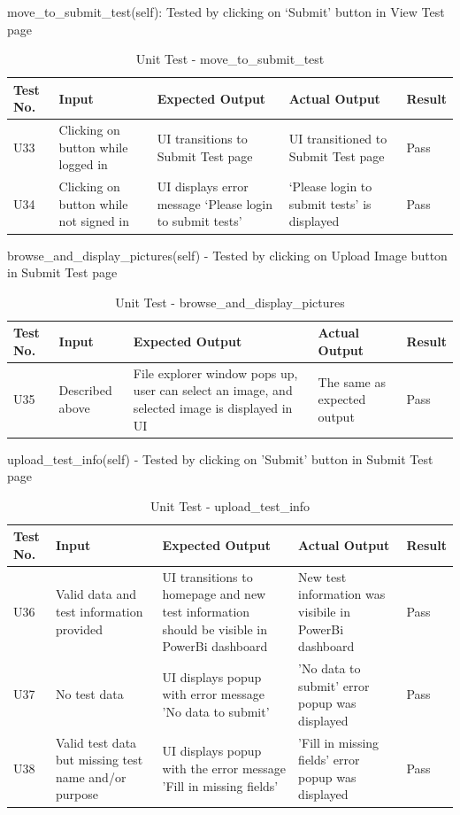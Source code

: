 \documentclass[12pt, titlepage]{article}
\begin{document}
move\_to\_submit\_test(self): Tested by clicking on ‘Submit’ button in View Test page
\begin{table}[H]
  \begin{tabular}{| p{} | p{}| p{}| p{}| p{}|}
    \hline
    \rowcolor[gray]{0.9}
    Test No. & Input & Expected Output & Actual Output & Result\\
    \hline
    U33 & Clicking on button while logged in & UI transitions to Submit Test page & UI transitioned to Submit Test page & Pass \\
    \hline
    U34 & Clicking on button while not signed in & UI displays error message ‘Please login to submit tests’ & ‘Please login to submit tests’ is displayed & Pass \\
    \hline
  \end{tabular}
  \caption{Unit Test - move\_to\_submit\_test}
\end{table}


browse\_and\_display\_pictures(self) - Tested by clicking on Upload Image button in Submit Test page  
\begin{table}[H]
  \begin{tabular}{| p{} | p{}| p{}| p{}| p{}|}
    \hline
    \rowcolor[gray]{0.9}
    Test No. & Input & Expected Output & Actual Output & Result\\
    \hline
    U35 & Described above & File explorer window pops up, user can select an image, and selected image is displayed in UI & The same as expected output & Pass \\
    \hline
  \end{tabular}
  \caption{Unit Test - browse\_and\_display\_pictures}
\end{table}

upload\_test\_info(self) - Tested by clicking on 'Submit' button in Submit Test page 
\begin{table}[H]
  \begin{tabular}{| p{} | p{}| p{}| p{}| p{}|}
    \hline
    \rowcolor[gray]{0.9}
    Test No. & Input & Expected Output & Actual Output & Result\\
    \hline
    U36 & Valid data and test information provided & UI transitions to homepage and new test information should be visible in PowerBi dashboard & New test information was visibile in PowerBi dashboard & Pass \\
    \hline
    U37 & No test data & UI displays popup with error message 'No data to submit' & 'No data to submit' error popup was displayed & Pass \\
    \hline
    U38 & Valid test data but missing test name and/or purpose & UI displays popup with the error message 'Fill in missing fields' & 'Fill in missing fields' error popup was displayed & Pass \\
    \hline
  \end{tabular}
  \caption{Unit Test - upload\_test\_info}
\end{table}
\end{document}
